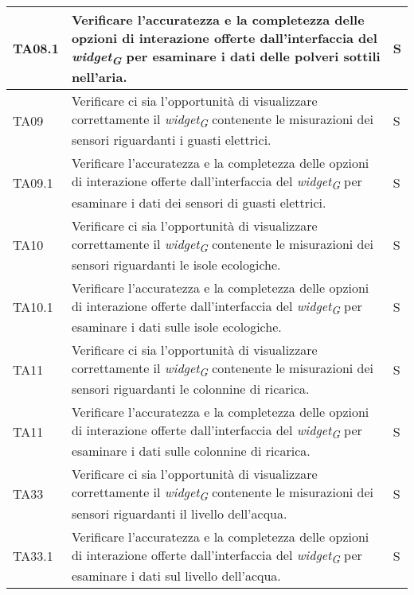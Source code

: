 \begin{longtable}{|C{1.9cm}|L{7cm}|C{2cm}|}
    TA08.1 & Verificare l'accuratezza e la completezza delle opzioni di interazione offerte dall'interfaccia del \textit{widget}\textsubscript{\textit{G}} per esaminare i dati delle polveri sottili nell'aria. & S \\
    \hline
    
    TA09 & Verificare ci sia l'opportunità di visualizzare correttamente il \textit{widget}\textsubscript{\textit{G}} contenente le misurazioni dei sensori riguardanti i guasti elettrici. & S \\
    \hline
    
    TA09.1 & Verificare l'accuratezza e la completezza delle opzioni di interazione offerte dall'interfaccia del \textit{widget}\textsubscript{\textit{G}} per esaminare i dati dei sensori di guasti elettrici. & S \\
    \hline
    
    TA10 & Verificare ci sia l'opportunità di visualizzare correttamente il \textit{widget}\textsubscript{\textit{G}} contenente le misurazioni dei sensori riguardanti le isole ecologiche. & S \\
    \hline
    
    TA10.1 & Verificare l'accuratezza e la completezza delle opzioni di interazione offerte dall'interfaccia del \textit{widget}\textsubscript{\textit{G}} per esaminare i dati sulle isole ecologiche. & S \\
    \hline
    
    TA11 & Verificare ci sia l'opportunità di visualizzare correttamente il \textit{widget}\textsubscript{\textit{G}} contenente le misurazioni dei sensori riguardanti le colonnine di ricarica. & S \\
    \hline
    
    TA11 & Verificare l'accuratezza e la completezza delle opzioni di interazione offerte dall'interfaccia del \textit{widget}\textsubscript{\textit{G}} per esaminare i dati sulle colonnine di ricarica. & S \\
    \hline
    
    TA33 & Verificare ci sia l'opportunità di visualizzare correttamente il \textit{widget}\textsubscript{\textit{G}} contenente le misurazioni dei sensori riguardanti il livello dell'acqua. & S \\
    \hline
    
    TA33.1 & Verificare l'accuratezza e la completezza delle opzioni di interazione offerte dall'interfaccia del \textit{widget}\textsubscript{\textit{G}} per esaminare i dati sul livello dell'acqua. & S \\
    \hline
    

\end{longtable}
